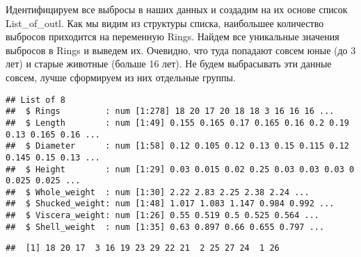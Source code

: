 \documentclass[]{article}
\newenvironment{Shaded}{\begin{snugshade}}{\end{snugshade}}
\newcommand{\ControlFlowTok}[1]{\textcolor[rgb]{0.13,0.29,0.53}{\textbf{#1}}}
\newcommand{\KeywordTok}[1]{\textcolor[rgb]{0.13,0.29,0.53}{\textbf{#1}}}
\newcommand{\NormalTok}[1]{#1}
\newcommand{\OperatorTok}[1]{\textcolor[rgb]{0.81,0.36,0.00}{\textbf{#1}}}
\newcommand{\StringTok}[1]{\textcolor[rgb]{0.31,0.60,0.02}{#1}}
\begin{document}
Идентифицируем все выбросы в наших данных и создадим на их основе список
List\_of\_outl. Как мы видим из структуры списка, наибольшее количество
выбросов приходится на переменную Rings. Найдем все уникальные значения
выбросов в Rings и выведем их. Очевидно, что туда попадают совсем юные
(до 3 лет) и старые животные (больше 16 лет). Не будем выбрасывать эти
данные совсем, лучше сформируем из них отдельные группы.

\begin{Shaded}
\end{Shaded}

\begin{verbatim}
## List of 8
##  $ Rings         : num [1:278] 18 20 17 20 18 18 3 16 16 16 ...
##  $ Length        : num [1:49] 0.155 0.165 0.17 0.165 0.16 0.2 0.19 0.13 0.165 0.16 ...
##  $ Diameter      : num [1:58] 0.12 0.105 0.12 0.13 0.15 0.115 0.12 0.145 0.15 0.13 ...
##  $ Height        : num [1:29] 0.03 0.015 0.02 0.25 0.03 0.03 0.03 0 0.025 0.025 ...
##  $ Whole_weight  : num [1:30] 2.22 2.83 2.25 2.38 2.24 ...
##  $ Shucked_weight: num [1:48] 1.017 1.083 1.147 0.984 0.992 ...
##  $ Viscera_weight: num [1:26] 0.55 0.519 0.5 0.525 0.564 ...
##  $ Shell_weight  : num [1:35] 0.63 0.897 0.66 0.655 0.797 ...
\end{verbatim}

\begin{Shaded}
\end{Shaded}

\begin{verbatim}
##  [1] 18 20 17  3 16 19 23 29 22 21  2 25 27 24  1 26
\end{verbatim}
\end{document}
